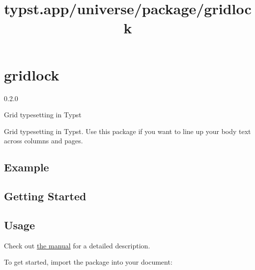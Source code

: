 \title{typst.app/universe/package/gridlock}

\label{banner}
\section{gridlock}\label{gridlock}

{ 0.2.0 }

Grid typesetting in Typst

\label{readme}
Grid typesetting in Typst. Use this package if you want to line up your
body text across columns and pages.

\subsection{Example}\label{example}


\subsection{Getting Started}\label{getting-started}

\begin{Shaded}
\begin{Highlighting}[]




\NormalTok{)}

\end{Highlighting}
\end{Shaded}

\subsection{Usage}\label{usage}

Check out
\href{https://github.com/typst/packages/raw/main/packages/preview/gridlock/0.2.0/docs/gridlock-manual.pdf}{the
manual} for a detailed description.

To get started, import the package into your document:

